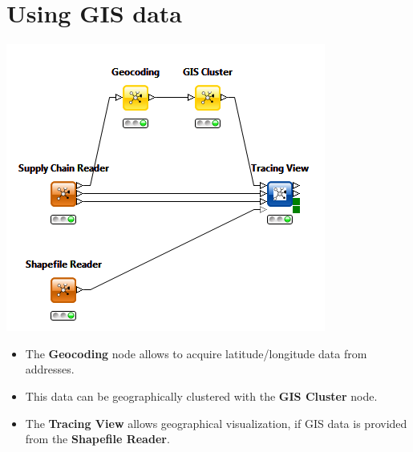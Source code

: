 \documentclass{beamer}
\begin{document}
\section{Using GIS data}
\begin{frame}
	\begin{center}
  		\includegraphics[height=0.6\textheight]{3.png}
	\end{center}
	\begin{itemize}
		\item The \textbf{Geocoding} node allows to acquire latitude/longitude data from addresses.
		\item This data can be geographically clustered with the \textbf{GIS Cluster} node.
		\item The \textbf{Tracing View} allows geographical visualization, if GIS data is provided from the \textbf{Shapefile Reader}.
	\end{itemize}		
\end{frame}
\end{document}
